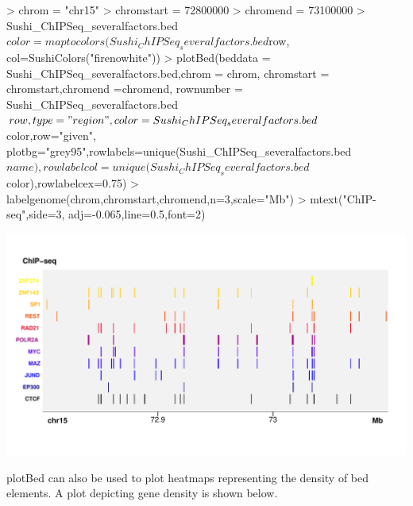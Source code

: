 \documentclass{article}
\begin{document}
\begin{center}
\begin{Schunk}
\begin{Sinput}
> chrom            = "chr15"
> chromstart       = 72800000
> chromend         = 73100000
> Sushi_ChIPSeq_severalfactors.bed$color = 
         maptocolors(Sushi_ChIPSeq_severalfactors.bed$row,
         col=SushiColors("firenowhite"))
> plotBed(beddata    = Sushi_ChIPSeq_severalfactors.bed,chrom = chrom,
         chromstart = chromstart,chromend =chromend,
         rownumber  = Sushi_ChIPSeq_severalfactors.bed$row, type = "region",
         color=Sushi_ChIPSeq_severalfactors.bed$color,row="given",
         plotbg="grey95",rowlabels=unique(Sushi_ChIPSeq_severalfactors.bed$name),
         rowlabelcol=unique(Sushi_ChIPSeq_severalfactors.bed$color),rowlabelcex=0.75)
> labelgenome(chrom,chromstart,chromend,n=3,scale="Mb")
> mtext("ChIP-seq",side=3, adj=-0.065,line=0.5,font=2)
\end{Sinput}
\end{Schunk}
\includegraphics{Sushi-028}
\end{center}

plotBed can also be used to plot heatmaps representing the density of bed elements.  A plot depicting gene density is shown below.
\end{document}
